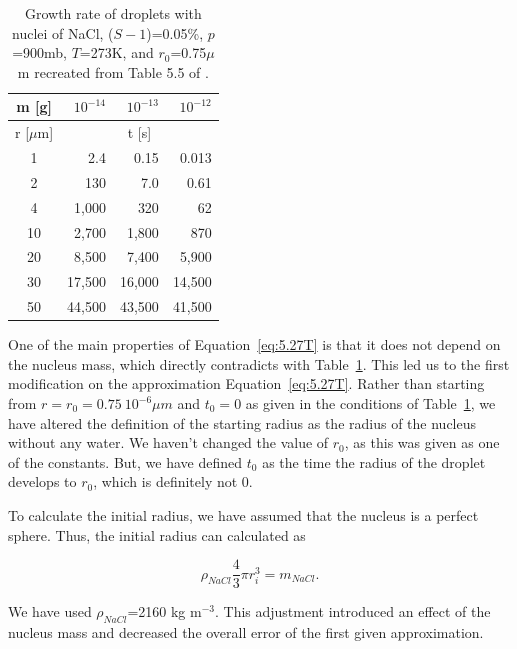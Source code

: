 \documentclass[titlepage]{article}
\newcommand{\ra}[1]{\renewcommand{\arraystretch}{#1}}
\begin{document}
\begin{table}[h]
    \centering
    \caption{Growth rate of droplets with nuclei of NaCl, ($S - 1$)=0.05\%,
        $p$=900mb, $T$=273K, and $r_0$=0.75$\mu$m recreated from Table 5.5 of \cite{Curry}.}
    \label{tab:Table5.5}

    \ra{1.2}
    \begin{tabular}{@{} c r r r @{}}
        \\
        \toprule
        m [g] & $10^{-14}$ & $10^{-13}$ & $10^{-12}$ \\
        \midrule
        r [$\mu$m] & \multicolumn{3}{c}{t [s]} \\
        \midrule
        1  & 2.4    & 0.15   & 0.013 \\
        2  & 130    & 7.0    & 0.61 \\
        4  & 1,000  & 320    & 62 \\
        10 & 2,700  & 1,800  & 870 \\
        20 & 8,500  & 7,400  & 5,900 \\
        30 & 17,500 & 16,000 & 14,500 \\
        50 & 44,500 & 43,500 & 41,500 \\
        \bottomrule
    \end{tabular}
\end{table}


One of the main properties of Equation~\eqref{eq:5.27T} is that it does not
depend on the nucleus mass, which directly contradicts with
Table~\ref{tab:Table5.5}. This led us to the first modification on the
approximation Equation~\eqref{eq:5.27T}. Rather than starting from
$r=r_{0}=0.75\ 10^{-6} \mu m$ and $t_{0}=0$ as given in the conditions of
Table~\ref{tab:Table5.5}, we have altered the definition of the starting radius
as the radius of the nucleus without any water. We haven't changed the value of
$r_{0}$, as this was given as one of the constants. But, we have defined
$t_{0}$ as the time the radius of the droplet develops to $r_{0}$, which is
definitely not $0$.

To calculate the initial radius, we have assumed that the nucleus is a perfect
sphere. Thus, the initial radius can calculated as

\begin{equation}
    \label{eq:InitialRadius}
    \rho_{NaCl}\frac{4}{3}\pi r_{i}^{3}=m_{NaCl} .
\end{equation}

We have used $\rho_{NaCl}$=2160 kg m$^{-3}$. This adjustment introduced an
effect of the nucleus mass and decreased the overall error of the first given
approximation.
\end{document}
